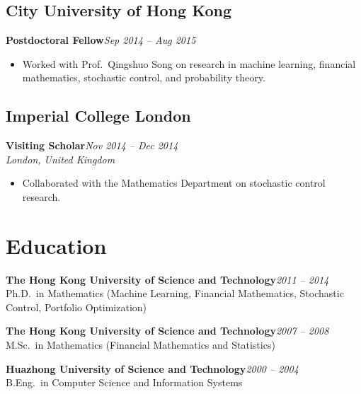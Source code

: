 \documentclass[11pt]{article}
\newcommand{\role}[2]{\textbf{#1}\hfill \textit{#2}}
\newcommand{\place}[1]{\textit{#1}}
\newcommand{\smallgap}{\vspace{4pt}}
\begin{document}
\subsection*{City University of Hong Kong}
\role{Postdoctoral Fellow}{Sep 2014 -- Aug 2015}
\begin{itemize}
  \item Worked with Prof.\ Qingshuo Song on research in machine learning, financial mathematics, stochastic control, and probability theory.
\end{itemize}

\subsection*{Imperial College London}
\role{Visiting Scholar}{Nov 2014 -- Dec 2014}
\\ \place{London, United Kingdom}
\begin{itemize}
  \item Collaborated with the Mathematics Department on stochastic control research.
\end{itemize}

\section{Education}

\role{The Hong Kong University of Science and Technology}{2011 -- 2014}
\\ Ph.D.\ in Mathematics (Machine Learning, Financial Mathematics, Stochastic Control, Portfolio Optimization)

\smallgap
\role{The Hong Kong University of Science and Technology}{2007 -- 2008}
\\ M.Sc.\ in Mathematics (Financial Mathematics and Statistics)

\smallgap
\role{Huazhong University of Science and Technology}{2000 -- 2004}
\\ B.Eng.\ in Computer Science and Information Systems

\end{document}
